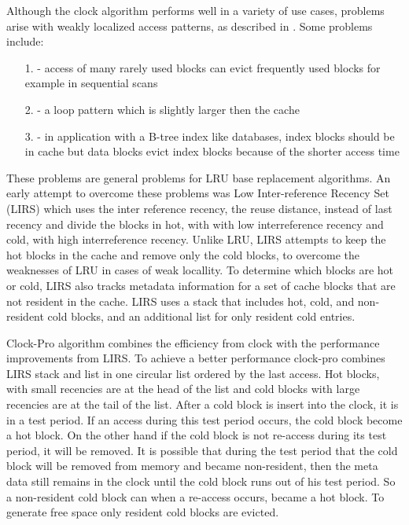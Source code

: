 \documentclass[
	12pt,
	a4paper,
	abstract,
	bibliography=totoc,
	chapterprefix,
	headings=openright,
	numbers=endperiod,
	parskip=half,
	twoside,
]{scrreprt}
\begin{document}
Although the clock algorithm performs well in a variety of use cases, problems arise with weakly localized access patterns, as described in \cite{jiang2005making}.
Some problems include:
\begin{itemize}
	\item[1.] - access of many rarely used blocks can evict frequently used blocks for example in sequential scans
	\item[2.] - a loop pattern which is slightly larger then the cache 
	\item[3.] - in application with a B-tree index like databases, index blocks should be in cache but data blocks
				evict index blocks because of the shorter access time
\end{itemize}

These problems are general problems for LRU base replacement algorithms.
An early attempt to overcome these problems was Low Inter-reference Recency Set (LIRS) \cite{10.1145/511399.511340} which uses the inter reference recency, the reuse distance, instead of last recency and divide the blocks in hot, with with low interreference recency and cold, with high interreference recency.
Unlike LRU, LIRS attempts to keep the hot blocks in the cache and remove only the cold blocks, to overcome the weaknesses of LRU in cases of weak locallity.
To determine which blocks are hot or cold, LIRS also tracks metadata information for a set of cache blocks that are not resident in the cache.
LIRS uses a stack that includes hot, cold, and non-resident cold blocks, and an additional list for only resident cold entries.

Clock-Pro algorithm \cite{jiang2005clock} combines the efficiency from clock with the performance improvements from LIRS.
To achieve a better performance clock-pro combines LIRS stack and list in one circular list ordered by the last access.
Hot blocks, with small recencies are at the head of the list and cold blocks with large recencies are at the tail of the list.
After a cold block is insert into the clock, it is in a test period.
If an access during this test period occurs, the cold block become a hot block.
On the other hand if the cold block is not re-access during its test period, it will be removed.
It is possible that during the test period that the cold block will be removed from memory and became non-resident, then the meta data still remains in the clock until the cold block runs out of his test period.
So a non-resident cold block can when a re-access occurs, became a hot block.
To generate free space only resident cold blocks are evicted.
\end{document}
